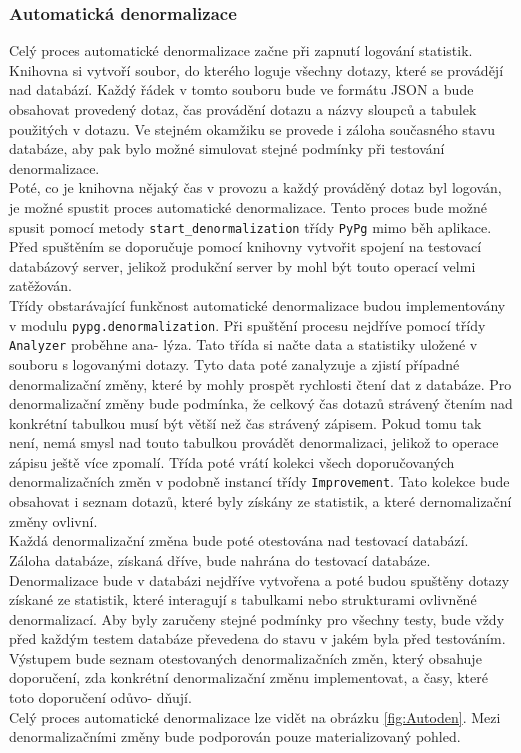 \documentclass[ing,male,java,dept456]{diploma}						%
\begin{document}

\subsubsection{Automatická denormalizace}

Celý proces automatické denormalizace začne při zapnutí logování statistik. Knihovna si vytvoří soubor, do kterého loguje všechny dotazy, které se provádějí nad databází. Každý řádek v tomto souboru bude ve formátu JSON a bude obsahovat provedený dotaz, čas provádění dotazu a názvy sloupců a tabulek použitých v dotazu. Ve stejném okamžiku se provede i záloha současného stavu databáze, aby pak bylo možné simulovat stejné podmínky při testování denormalizace. \\
Poté, co je knihovna nějaký čas v provozu a každý prováděný dotaz byl logován, je možné spustit proces automatické denormalizace. Tento proces bude možné spusit pomocí metody \lstinline[style=inlinepython]|start_denormalization| třídy \lstinline[style=inlinepython]|PyPg| mimo běh aplikace. Před spuštěním se doporučuje pomocí knihovny vytvořit spojení na testovací databázový server, jelikož produkční server by mohl být touto operací velmi zatěžován. \\
Třídy obstarávající funkčnost automatické denormalizace budou implementovány v modulu \lstinline[style=inlinepython]|pypg.denormalization|. Při spuštění procesu nejdříve pomocí třídy \lstinline[style=inlinepython]|Analyzer| proběhne ana- lýza. Tato třída si načte data a statistiky uložené v souboru s logovanými dotazy. Tyto data poté zanalyzuje a zjistí případné denormalizační změny, které by mohly prospět rychlosti čtení dat z databáze. Pro denormalizační změny bude podmínka, že celkový čas dotazů strávený čtením nad konkrétní tabulkou musí být větší než čas strávený zápisem. Pokud tomu tak není, nemá smysl nad touto tabulkou provádět denormalizaci, jelikož to operace zápisu ještě více zpomalí. Třída poté vrátí kolekci všech doporučovaných denormalizačních změn v podobně instancí třídy \lstinline[style=inlinepython]|Improvement|. Tato kolekce bude obsahovat i seznam dotazů, které byly získány ze statistik, a které dernomalizační změny ovlivní. \\
Každá denormalizační změna bude poté otestována nad testovací databází. Záloha databáze, získaná dříve, bude nahrána do testovací databáze. Denormalizace bude v databázi nejdříve vytvořena a poté budou spuštěny dotazy získané ze statistik, které interagují s tabulkami nebo strukturami ovlivněné denormalizací. Aby byly zaručeny stejné podmínky pro všechny testy, bude vždy před každým testem databáze převedena do stavu v jakém byla před testováním. \\
Výstupem bude seznam otestovaných denormalizačních změn, který obsahuje doporučení, zda konkrétní denormalizační změnu implementovat, a časy, které toto doporučení odůvo- dňují. \\
Celý proces automatické denormalizace lze vidět na obrázku \ref{fig:Autoden}. Mezi denormalizačními změny bude podporován pouze materializovaný pohled.
\end{document}
